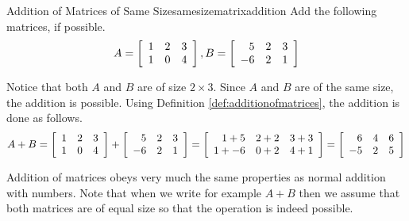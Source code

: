 \begin{example}{Addition of Matrices of Same Size}{samesizematrixaddition}
Add the following matrices, if possible.
\begin{equation*}
A = \left[
\begin{array}{ccc}
1 & 2 & 3 \\
1 & 0 & 4
\end{array}
\right],
B = \left[
\begin{array}{rrr}
5 & 2 & 3 \\
-6 & 2 & 1
\end{array}
\right]
\end{equation*}
\end{example}

\begin{solution}
Notice that both $A$ and $B$ are of size $2 \times 3$. 
Since $A$ and $B$ are of the same size, the addition is possible. Using Definition \ref{def:additionofmatrices}, 
the addition is done as follows. 
\begin{equation*}
A + B = \left[
\begin{array}{rrr}
1 & 2 & 3 \\
1 & 0 & 4
\end{array}
\right]
+
\left[
\begin{array}{rrr}
5 & 2 & 3 \\
-6 & 2 & 1
\end{array}
\right]
=\allowbreak 
\left[
\begin{array}{rrr}
1+5 & 2+2 & 3+3 \\
1+ -6 & 0+2 & 4+1
\end{array}
\right]
=
\left[
\begin{array}{rrr}
6 & 4 & 6 \\
-5 & 2 & 5
\end{array}
\right]
\end{equation*}
\end{solution}

Addition of matrices obeys very much the same properties as normal
addition with numbers. Note that when we write for example $A+B$ then
we assume that both matrices are of equal size so that the operation
is indeed possible.

